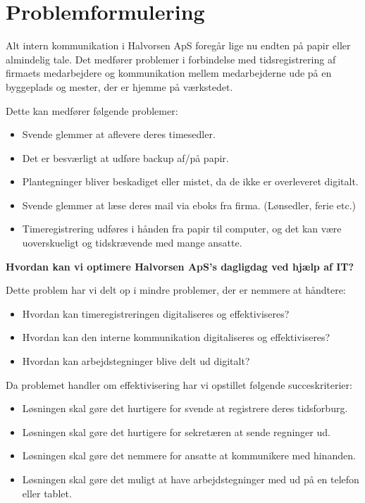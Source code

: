 \section{Problemformulering} \label{problemformulering}

Alt intern kommunikation i Halvorsen ApS foregår lige nu endten på papir eller almindelig tale. Det medfører problemer i forbindelse med tidsregistrering af firmaets medarbejdere og kommunikation mellem medarbejderne ude på en byggeplads og mester, der er hjemme på værkstedet.

Dette kan medfører følgende problemer:
\begin{itemize}
    \item Svende glemmer at aflevere deres timesedler.
    \item Det er besværligt at udføre backup af/på papir.
    \item Plantegninger bliver beskadiget eller mistet, da de ikke er overleveret digitalt.
    \item Svende glemmer at læse deres mail via eboks fra firma. (Lønsedler, ferie etc.)
    \item Timeregistrering udføres i hånden fra papir til computer, og det kan være uoverskueligt og tidskrævende med mange ansatte.
\end{itemize}

\textbf{Hvordan kan vi optimere Halvorsen ApS's dagligdag ved hjælp af IT?}

Dette problem har vi delt op i mindre problemer, der er nemmere at håndtere:
\begin{itemize}
    \item Hvordan kan timeregistreringen digitaliseres og effektiviseres?
    \item Hvordan kan den interne kommunikation digitaliseres og effektiviseres?
    \item Hvordan kan arbejdstegninger blive delt ud digitalt?
\end{itemize}

Da problemet handler om effektivisering har vi opstillet følgende succeskriterier:

\begin{itemize}
    \item Løsningen skal gøre det hurtigere for svende at registrere deres tidsforburg.
    \item Løsningen skal gøre det hurtigere for sekretæren at sende regninger ud.
    \item Løsningen skal gøre det nemmere for ansatte at kommunikere med hinanden.
    \item Løsningen skal gøre det muligt at have arbejdstegninger med ud på en telefon eller tablet.
\end{itemize}